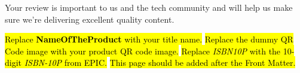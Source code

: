 \begin{flushleft}
Your review is important to us and the tech community and will help us make sure we’re delivering excellent quality content.

\hl{Replace \textbf{NameOfTheProduct} with your title name.}
\newline
\hl{Replace the dummy QR Code image with your product QR code image.}
\newline
\hl{Replace \textit{ISBN10P} with the 10-digit \textit{ISBN-10P} from EPIC.}
\newline
\hl{This page should be added after the Front Matter.}

\clearpage

\end{flushleft}
